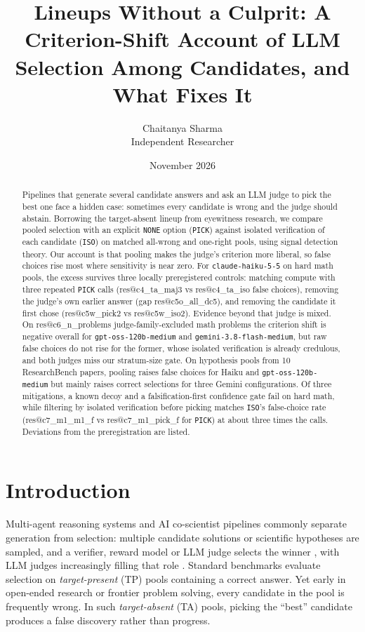 \documentclass[10pt,twocolumn]{article}
\title{Lineups Without a Culprit: A Criterion-Shift Account of LLM Selection Among Candidates, and What Fixes It}
\author{Chaitanya Sharma\\Independent Researcher}
\date{November 2026}
\makeatletter
\newcommand{\res}[1]{\csname res@#1\endcsname}
\makeatother
\begin{document}
\sloppy
\maketitle

\begin{abstract}
Pipelines that generate several candidate answers and ask an LLM judge to pick the best one face a hidden case: sometimes every candidate is wrong and the judge should abstain. Borrowing the target-absent lineup from eyewitness research, we compare pooled selection with an explicit \texttt{NONE} option (\texttt{PICK}) against isolated verification of each candidate (\texttt{ISO}) on matched all-wrong and one-right pools, using signal detection theory. Our account is that pooling makes the judge's criterion more liberal, so false choices rise most where sensitivity is near zero. For \texttt{claude-haiku-5-5} on hard math pools, the excess survives three locally preregistered controls: matching compute with three repeated \texttt{PICK} calls (\res{c4_ta_maj3} vs \res{c4_ta_iso} false choices), removing the judge's own earlier answer (gap \res{c5o_all_dc5}), and removing the candidate it first chose (\res{c5w_pick2} vs \res{c5w_iso2}). Evidence beyond that judge is mixed. On \res{c6_n_problems} judge-family-excluded math problems the criterion shift is negative overall for \texttt{gpt-oss-120b-medium} and \texttt{gemini-3.8-flash-medium}, but raw false choices do not rise for the former, whose isolated verification is already credulous, and both judges miss our stratum-size gate. On hypothesis pools from 10 ResearchBench papers, pooling raises false choices for Haiku and \texttt{gpt-oss-120b-medium} but mainly raises correct selections for three Gemini configurations. Of three mitigations, a known decoy and a falsification-first confidence gate fail on hard math, while filtering by isolated verification before picking matches \texttt{ISO}'s false-choice rate (\res{c7_m1_m1_f} vs \res{c7_m1_pick_f} for \texttt{PICK}) at about three times the calls. Deviations from the preregistration are listed.
\end{abstract}

\section{Introduction}
Multi-agent reasoning systems and AI co-scientist pipelines commonly separate generation from selection: multiple candidate solutions or scientific hypotheses are sampled, and a verifier, reward model or LLM judge selects the winner \citep{cobbe2021training,brown2024large,gottweis2025towards}, with LLM judges increasingly filling that role \citep{zheng2023judging}. Standard benchmarks evaluate selection on \emph{target-present} (TP) pools containing a correct answer. Yet early in open-ended research or frontier problem solving, every candidate in the pool is frequently wrong. In such \emph{target-absent} (TA) pools, picking the ``best'' candidate produces a false discovery rather than progress.
\end{document}
